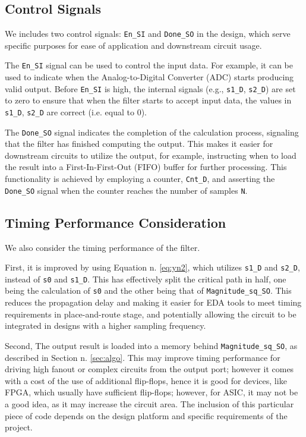 \subsection{Control Signals}

We includes two control signals: \texttt{En\_SI} and \texttt{Done\_SO} in the design, which serve specific purposes for ease of application and downstream circuit usage.

The \texttt{En\_SI} signal can be used to control the input data. For example, it can be used to indicate when the Analog-to-Digital Converter (ADC) starts producing valid output. Before \texttt{En\_SI} is high, the internal signals (e.g., \texttt{s1\_D}, \texttt{s2\_D}) are set to zero to ensure that when the filter starts to accept input data, the values in \texttt{s1\_D}, \texttt{s2\_D} are correct (i.e. equal to 0).

The \texttt{Done\_SO} signal indicates the completion of the calculation process, signaling that the filter has finished computing the output. This makes it easier for downstream circuits to utilize the output, for example, instructing when to load the result into a First-In-First-Out (FIFO) buffer for further processing. This functionality is achieved by employing a counter, \texttt{Cnt\_D}, and asserting the \texttt{Done\_SO} signal when the counter reaches the number of samples \texttt{N}.

\subsection{Timing Performance Consideration}

We also consider the timing performance of the filter.

First, it is improved by using Equation n. \ref{eq:yn2}, which utilizes \texttt{s1\_D} and \texttt{s2\_D}, instead of \texttt{s0} and \texttt{s1\_D}. This has effectively split the critical path in half, one being the calculation of \texttt{s0} and the other being that of \texttt{Magnitude\_sq\_SO}. This reduces the propagation delay and making it easier for EDA tools to meet timing requirements in place-and-route stage, and potentially allowing the circuit to be integrated in designs with a higher sampling frequency.

Second, The output result is loaded into a memory behind \texttt{Magnitude\_sq\_SO}, as described in Section n. \ref{sec:algo}. This may improve timing performance for driving high fanout or complex circuits from the output port; however it comes with a cost of the use of additional flip-flops, hence it is good for devices, like FPGA, which usually have sufficient flip-flops; however, for ASIC, it may not be a good idea, as it may increase the circuit area. The inclusion of this particular piece of code depends on the design platform and specific requirements of the project.




